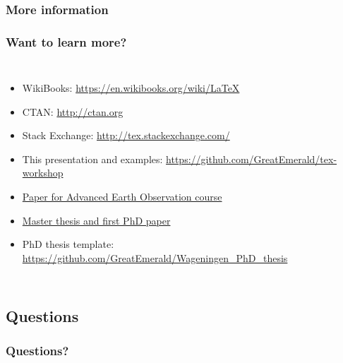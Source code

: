 \documentclass[colorlinks]{beamer} %
\begin{document}
  \subsubsection{More information}
  \begin{frame}
    \frametitle{Want to learn more?}
    \begin{columns}
      \begin{itemize}
	\item WikiBooks: \href{https://en.wikibooks.org/wiki/LaTeX}{https://en.wikibooks.org/wiki/LaTeX}
	\item CTAN: \href{http://ctan.org}{http://ctan.org}
	\item Stack Exchange: \href{http://tex.stackexchange.com/}{http://tex.stackexchange.com/}
	\item This presentation and examples: \href{https://github.com/GreatEmerald/tex-workshop}{https://github.com/GreatEmerald/tex-workshop}
	\item \href{https://github.com/GreatEmerald/AEO-validation-paper/tree/master/paper}{Paper for Advanced Earth Observation course}
	\item \href{https://github.com/GreatEmerald/master-classification/tree/master/thesis}{Master thesis and first PhD paper}
	\item PhD thesis template: \href{https://github.com/GreatEmerald/Wageningen\_PhD\_thesis}{https://github.com/GreatEmerald/Wageningen\_PhD\_thesis}
      \end{itemize}
      
    \end{columns}
  \end{frame}
  
  \subsection{Questions}
  \begin{frame}
    \frametitle{Questions?}
    \tableofcontents[sectionstyle=shaded/show,subsectionstyle=shaded/shaded/show,subsubsectionstyle=shaded/shaded/shaded/show]
  \end{frame}

  
\end{document}
